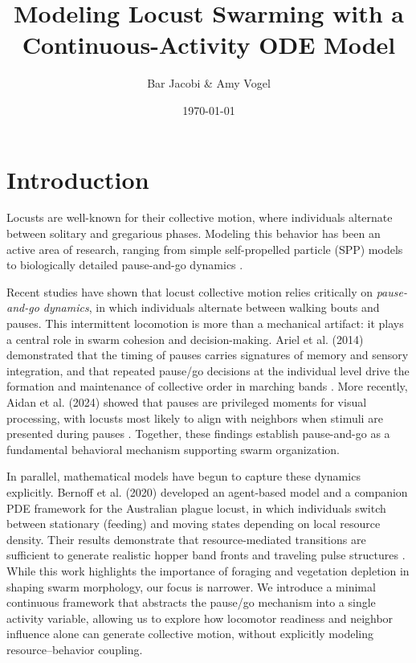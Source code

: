 \documentclass[11pt,a4paper]{article}
\title{Modeling Locust Swarming with a Continuous-Activity ODE Model}
\author{Bar Jacobi \& Amy Vogel}
\date{\today}
\begin{document}
\maketitle

\section{Introduction}

Locusts are well-known for their collective motion, where individuals alternate between solitary and gregarious phases. Modeling this behavior has been an active area of research, ranging from simple self-propelled particle (SPP) models to biologically detailed pause-and-go dynamics \cite{ariel2015locust}.  

Recent studies have shown that locust collective motion relies critically on \emph{pause-and-go dynamics}, in which individuals alternate between walking bouts and pauses. This intermittent locomotion is more than a mechanical artifact: it plays a central role in swarm cohesion and decision-making. Ariel et al. (2014) demonstrated that the timing of pauses carries signatures of memory and sensory integration, and that repeated pause/go decisions at the individual level drive the formation and maintenance of collective order in marching bands \cite{ariel2014pausego}. More recently, Aidan et al. (2024) showed that pauses are privileged moments for visual processing, with locusts most likely to align with neighbors when stimuli are presented during pauses  \cite{aidan2024pausing}. Together, these findings establish pause-and-go as a fundamental behavioral mechanism supporting swarm organization.  

In parallel, mathematical models have begun to capture these dynamics explicitly. Bernoff et al. (2020) developed an agent-based model and a companion PDE framework for the Australian plague locust, in which individuals switch between stationary (feeding) and moving states depending on local resource density. Their results demonstrate that resource-mediated transitions are sufficient to generate realistic hopper band fronts and traveling pulse structures \cite{bernoff2020agentbased}. While this work highlights the importance of foraging and vegetation depletion in shaping swarm morphology, our focus is narrower. We introduce a minimal continuous framework that abstracts the pause/go mechanism into a single activity variable, allowing us to explore how locomotor readiness and neighbor influence alone can generate collective motion, without explicitly modeling resource--behavior coupling.  
\end{document}
